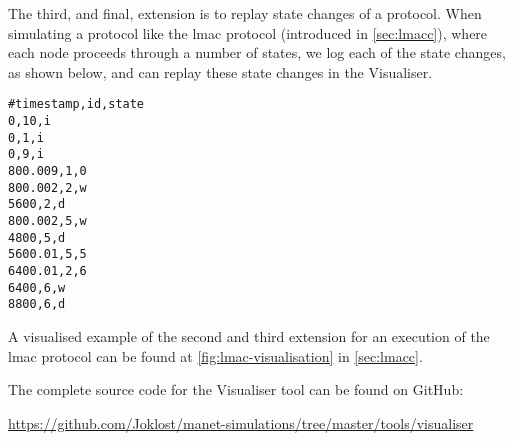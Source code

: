 The third, and final, extension is to replay state changes of a protocol. When simulating a protocol like the
\gls{lmac} protocol (introduced in \autoref{sec:lmacc}), where each node proceeds through a number of states,
we log each of the state changes, as shown below, and can replay these state changes in the Visualiser.
%
\begin{verbatim}
#timestamp,id,state
0,10,i
0,1,i
0,9,i
800.009,1,0
800.002,2,w
5600,2,d
800.002,5,w
4800,5,d
5600.01,5,5
6400.01,2,6
6400,6,w
8800,6,d
\end{verbatim}

A visualised example of the second and third extension for an execution of the \gls{lmac} protocol can be
found at \autoref{fig:lmac-visualisation} in \autoref{sec:lmacc}. \medbreak


The complete source code for the Visualiser tool can be found on GitHub:

{\small \url{https://github.com/Joklost/manet-simulations/tree/master/tools/visualiser}}
%